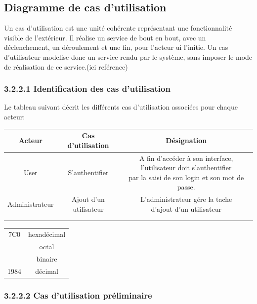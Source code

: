 \documentclass[14pt,A4,french,oneside,leqno]{report}
\begin{document}
	\subsection{Diagramme de cas d'utilisation}
	\textrm{Un cas d'utilisation est une unité cohérente représentant une fonctionnalité visible de l'extérieur. Il réalise un service de bout en bout, avec un déclenchement, un déroulement et une fin, pour l'acteur ui l'initie. Un cas d'utilisateur modelise donc un service rendu par le système, sans imposer le mode de réalisation de ce service.(ici reférence)}\\
	
\subsubsection{3.2.2.1  Identification des cas d'utilisation}	
\textrm{Le tableau suivant décrit les différents cas d'utilisation associées pour chaque acteur:}\\

\begin{table}[h]
	\begin{tabular}{|c|c|c|}
		\hline 
		\textbf{Acteur}& \textbf{Cas d'utilisation} &  \textbf{Désignation}\\ 
		\hline 
		User & S'authentifier & \parbox{0.3\linewidth}{A fin d'accéder à son interface, 
			l'utilisateur doit s'authentifier \\par la saisi de son login et son mot de passe.} \\ 
		\hline 
	 	Administrateur&Ajout d’un utilisateur  & \parbox{0.3\linewidth}{L’administrateur gére la tache\\d’ajout d’un utilisateur}  \\ 
		\hline 
		&  &  \\ 
		\hline 
		&  &  \\ 
		\hline 
	\end{tabular} 
\end{table}
\begin{tabular}{|c|c|}
	\hline
	7C0 & hexad\'ecimal \\
	 & octal         \\
	\cline{2-2}
	 & binaire       \\
	\hline

	1984 & d\'ecimal     \\
	\hline
\end{tabular}	
\subsubsection{3.2.2.2  Cas d'utilisation préliminaire}
\end{document}
